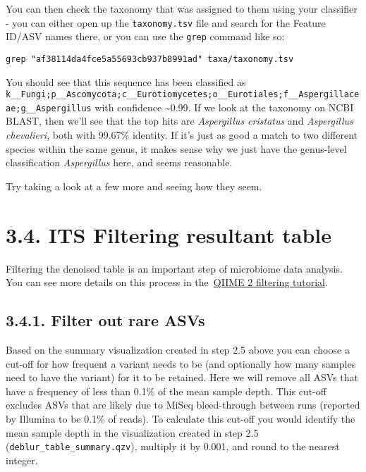 \documentclass[
]{book}
\begin{document}
You can then check the taxonomy that was assigned to them using your classifier - you can either open up the \texttt{taxonomy.tsv} file and search for the Feature ID/ASV names there, or you can use the \texttt{grep} command like so:

\begin{verbatim}
grep "af38114da4fce5a55693cb937b8991ad" taxa/taxonomy.tsv
\end{verbatim}

You should see that this sequence has been classified as \texttt{k\_\_Fungi;p\_\_Ascomycota;c\_\_Eurotiomycetes;o\_\_Eurotiales;f\_\_Aspergillaceae;g\_\_Aspergillus} with confidence \textasciitilde0.99. If we look at the taxonomy on NCBI BLAST, then we'll see that the top hits are \emph{Aspergillus cristatus} and \emph{Aspergillus chevalieri}, both with 99.67\% identity. If it's just as good a match to two different species within the same genus, it makes sense why we just have the genus-level classification \emph{Aspergillus} here, and seems reasonable.

Try taking a look at a few more and seeing how they seem.

\section{3.4. ITS Filtering resultant table}\label{its-filtering-resultant-table}

Filtering the denoised table is an important step of microbiome data analysis. You can see more details on this process in the~\href{https://docs.qiime2.org/2022.11/tutorials/filtering/}{QIIME 2 filtering tutorial}.

\subsection{3.4.1. Filter out rare ASVs}\label{filter-out-rare-asvs-2}

Based on the summary visualization created in step 2.5 above you can choose a cut-off for how frequent a variant needs to be (and optionally how many samples need to have the variant) for it to be retained. Here we will remove all ASVs that have a frequency of less than 0.1\% of the mean sample depth. This cut-off excludes ASVs that are likely due to MiSeq bleed-through between runs (reported by Illumina to be 0.1\% of reads). To calculate this cut-off you would identify the mean sample depth in the visualization created in step 2.5 (\texttt{deblur\_table\_summary.qzv}), multiply it by 0.001, and round to the nearest integer.
\end{document}
